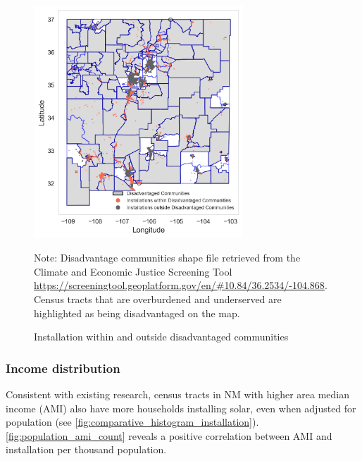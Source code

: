 \documentclass[12pt,twoside,letterpaper]{article}
\begin{document}
\begin{figure}[H]
    \centering
\includegraphics[width=0.7\textwidth]{figures/disadvantage_installation.png}
    \caption{Installation within and outside disadvantaged communities}
    \label{fig:disadvantage_installation}
        \begin{flushleft}
        \footnotesize Note: Disadvantage communities shape file retrieved from the Climate and Economic Justice Screening Tool \url{https://screeningtool.geoplatform.gov/en/#10.84/36.2534/-104.868}. Census tracts that are overburdened and underserved are highlighted as being disadvantaged on the map.
    \end{flushleft}
\end{figure}


\subsubsection{Income distribution}

Consistent with existing research, census tracts in NM with higher area median income (AMI) also have more households installing solar, even when adjusted for population (see \autoref{fig:comparative_histogram_installation}). \autoref{fig:population_ami_count} reveals a positive correlation between AMI and installation per thousand population.
\end{document}

